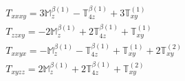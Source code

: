 \documentclass[fleqn,8pt,landscape]{jsarticle}
\begin{document}
\begin{align*}
& T_{xxxy} = 3 \mathbb{M}_{z}^{\beta(1)} - \mathbb{T}_{4z}^{\beta(1)} + 3 \mathbb{T}_{xy}^{(1)} \\
& T_{zzxy} = - 2 \mathbb{M}_{z}^{\beta(1)} + 2 \mathbb{T}_{4z}^{\beta(1)} + \mathbb{T}_{xy}^{(1)} \\
& T_{xxyx} = - \mathbb{M}_{z}^{\beta(1)} - \mathbb{T}_{4z}^{\beta(1)} + \mathbb{T}_{xy}^{(1)} + 2 \mathbb{T}_{xy}^{(2)} \\
& T_{xyzz} = 2 \mathbb{M}_{z}^{\beta(1)} + 2 \mathbb{T}_{4z}^{\beta(1)} + \mathbb{T}_{xy}^{(2)}
\end{align*}
\end{document}
